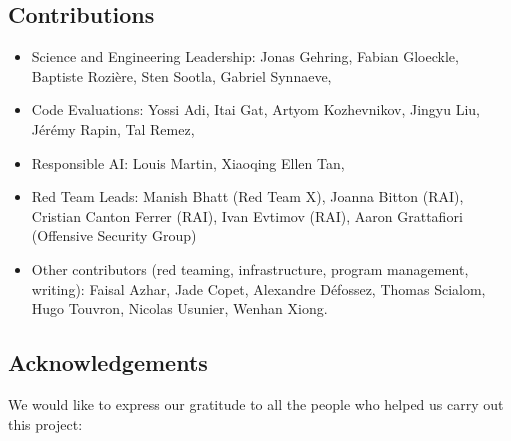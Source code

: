 \documentclass[10pt]{article}
\begin{document}
\subsection{Contributions}
\begin{itemize}
    \item Science and Engineering Leadership: Jonas Gehring, Fabian Gloeckle, Baptiste Rozi\`{e}re, Sten Sootla, Gabriel Synnaeve,
    \item Code Evaluations: Yossi Adi, Itai Gat, Artyom Kozhevnikov, Jingyu Liu, J\'{e}r\'{e}my Rapin, Tal Remez,
    \item Responsible AI: Louis Martin, Xiaoqing Ellen Tan,
    \item Red Team Leads: Manish Bhatt (Red Team X), Joanna Bitton (RAI), Cristian Canton Ferrer (RAI), Ivan Evtimov (RAI), Aaron Grattafiori (Offensive Security Group)  
    \item Other contributors (red teaming, infrastructure, program management, writing): Faisal Azhar, Jade Copet, Alexandre D\'{e}fossez, Thomas Scialom, Hugo Touvron, Nicolas Usunier, Wenhan Xiong.
\end{itemize}


\subsection{Acknowledgements}

We would like to express our gratitude to all the people who helped us carry out this project:
\end{document}

